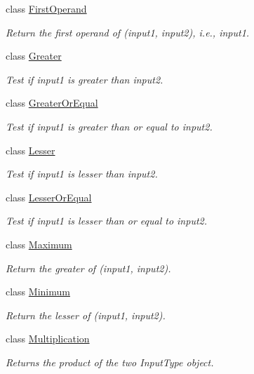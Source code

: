 \begin{DoxyCompactItemize}
class \hyperlink{classvct_binary_operations_1_1_first_operand}{First\-Operand}
\begin{DoxyCompactList}\small\item\em Return the first operand of (input1, input2), i.\-e., input1. \end{DoxyCompactList}\item 
class \hyperlink{classvct_binary_operations_1_1_greater}{Greater}
\begin{DoxyCompactList}\small\item\em Test if input1 is greater than input2. \end{DoxyCompactList}\item 
class \hyperlink{classvct_binary_operations_1_1_greater_or_equal}{Greater\-Or\-Equal}
\begin{DoxyCompactList}\small\item\em Test if input1 is greater than or equal to input2. \end{DoxyCompactList}\item 
class \hyperlink{classvct_binary_operations_1_1_lesser}{Lesser}
\begin{DoxyCompactList}\small\item\em Test if input1 is lesser than input2. \end{DoxyCompactList}\item 
class \hyperlink{classvct_binary_operations_1_1_lesser_or_equal}{Lesser\-Or\-Equal}
\begin{DoxyCompactList}\small\item\em Test if input1 is lesser than or equal to input2. \end{DoxyCompactList}\item 
class \hyperlink{classvct_binary_operations_1_1_maximum}{Maximum}
\begin{DoxyCompactList}\small\item\em Return the greater of (input1, input2). \end{DoxyCompactList}\item 
class \hyperlink{classvct_binary_operations_1_1_minimum}{Minimum}
\begin{DoxyCompactList}\small\item\em Return the lesser of (input1, input2). \end{DoxyCompactList}\item 
class \hyperlink{classvct_binary_operations_1_1_multiplication}{Multiplication}
\begin{DoxyCompactList}\small\item\em Returns the product of the two Input\-Type object. \end{DoxyCompactList}\item 

\end{DoxyCompactItemize}

